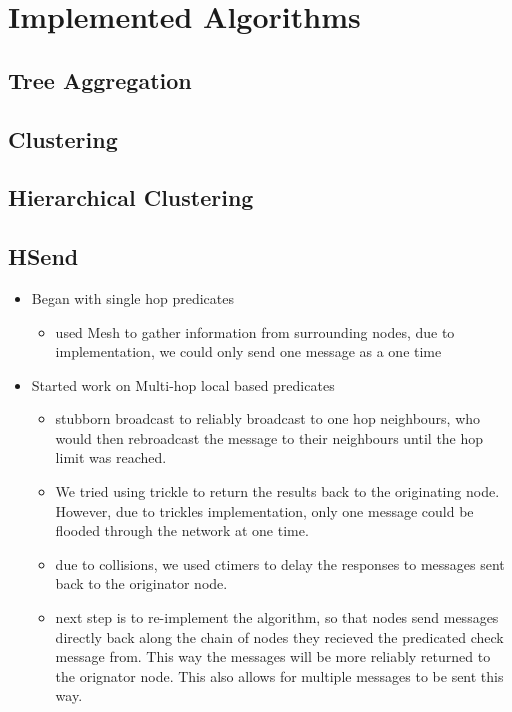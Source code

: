 \section{Implemented Algorithms}


\subsection{Tree Aggregation}


\subsection{Clustering}


\subsection{Hierarchical Clustering}

\subsection{HSend}
\begin{itemize}
	\item[] Began with single hop predicates
	\begin{itemize}
		\item used Mesh to gather information from surrounding nodes, due to implementation, we could only send one message as a one time
	\end{itemize}	
	\item[] Started work on Multi-hop local based predicates
	\begin{itemize}
		\item stubborn broadcast to reliably broadcast to one hop neighbours, who would then rebroadcast the message to their neighbours until the hop limit was reached.
		\item We tried using trickle to return the results back to the originating node. However, due to trickles implementation, only one message could be flooded through the network at one time. 
		\item due to collisions, we used ctimers to delay the responses to messages sent back to the originator node.
		\item next step is to re-implement the algorithm, so that nodes send messages directly back along the chain of nodes they recieved the predicated check message from. This way the messages will be more reliably returned to the orignator node. This also allows for multiple messages to be sent this way.
	\end{itemize}	
\end{itemize}